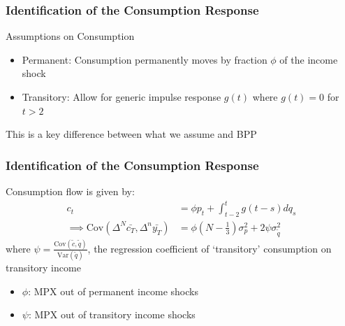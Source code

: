 \documentclass{beamer}
\begin{document}
\frame
{
	\frametitle{Identification of the Consumption Response}
	Assumptions on Consumption\\
	\begin{itemize}
		\item Permanent: Consumption permanently moves by fraction $\phi$ of the income shock
		\item Transitory: Allow for generic impulse response $g(t)$ where $g(t) = 0$ for $t>2$
	\end{itemize}
	\vspace*{-0.2in}
	\begin{center}
	\end{center}
	\vspace*{-0.2in}
	This is a key difference between what we assume and BPP
}
\frame
{
	\frametitle{Identification of the Consumption Response}
	Consumption flow is given by:
	\begin{align*}
	c_t  &= \phi p_t  + \int_{t-2}^{t} g(t-s)dq_s  \\
	\implies \mathrm{Cov}(\Delta^N \bar{c_T},\Delta^n \bar{y_T} ) &= \phi (N-\frac{1}{3}) \sigma^2_p + 2 \psi \sigma^2_{\tilde{q}}
	\end{align*}
	where  $\psi = \frac{\mathrm{Cov}(\tilde{c},\tilde{q})}{\mathrm{Var}(\tilde{q})}$, the regression coefficient of `transitory' consumption on transitory income \\
	\pause
	\bigskip
	\begin{itemize}
		\item $\phi$: MPX out of permanent income shocks
		\item $\psi$: MPX out of transitory income shocks
	\end{itemize}
}
\end{document}
